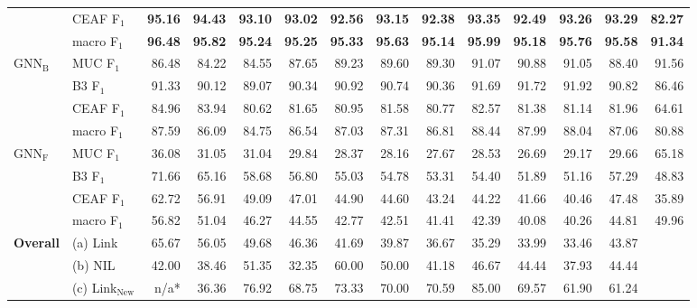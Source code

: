 \begin{landscape}
\begin{table}
\begin{tabular}{llrrrrrrrrrrrr}
& CEAF F$_1$      &  \textbf{95.16} &  \textbf{94.43} &  \textbf{93.10} &  \textbf{93.02} &  \textbf{92.56} &  \textbf{93.15} &  \textbf{92.38} &  \textbf{93.35} &  \textbf{92.49} &  \textbf{93.26} &  \textbf{93.29} & \textbf{82.27} \\
& macro F$_1$       &  \textbf{96.48} &  \textbf{95.82} &  \textbf{95.24} &  \textbf{95.25} &  \textbf{95.33} &  \textbf{95.63} &  \textbf{95.14} &  \textbf{95.99} &  \textbf{95.18} &  \textbf{95.76} &  \textbf{95.58} & \textbf{91.34} \\
\hline
$\text{GNN}_\text{B}$ & MUC F$_1$       &  86.48 &  84.22 &  84.55 &  87.65 &  89.23 &  89.60 &  89.30 &  91.07 &  90.88 &  91.05 &  88.40 & 91.56 \\
& B3 F$_1$        &  91.33 &  90.12 &  89.07 &  90.34 &  90.92 &  90.74 &  90.36 &  91.69 &  91.72 &  91.92 &  90.82 & 86.46 \\
& CEAF F$_1$      &  84.96 &  83.94 &  80.62 &  81.65 &  80.95 &  81.58 &  80.77 &  82.57 &  81.38 &  81.14 & 81.96  & 64.61  \\
& macro F$_1$ &  87.59 &  86.09 &  84.75 &  86.54 &  87.03 &  87.31 &  86.81 &  88.44 &  87.99 &  88.04 &  87.06 & 80.88 \\
\hline
$\text{GNN}_\text{F}$ & MUC F$_1$       &  36.08 &  31.05 &  31.04 &  29.84 &  28.37 &  28.16 &  27.67 &  28.53 &  26.69 &  29.17 &  29.66 &  65.18 \\
& B3 F$_1$        &  71.66 &  65.16 &  58.68 &  56.80 &  55.03 &  54.78 &  53.31 &  54.40 &  51.89 &  51.16 &  57.29 & 48.83 \\
& CEAF F$_1$      &  62.72 &  56.91 &  49.09 &  47.01 &  44.90 &  44.60 &  43.24 &  44.22 &  41.66 &  40.46 &  47.48 & 35.89 \\
& macro F$_1$ &  56.82 &  51.04 &  46.27 &  44.55 &  42.77 &  42.51 &  41.41 &  42.39 &  40.08 &  40.26 &  44.81 & 49.96 \\
\hline
\textbf{Overall} & (a) Link     &  65.67 &  56.05 &  49.68 &  46.36 &  41.69 &  39.87 &  36.67 &  35.29 &  33.99 &  33.46 &  43.87 & \\
& (b) NIL      &  42.00 &  38.46 &  51.35 &  32.35 &  60.00 &  50.00 &  41.18 &  46.67 &  44.44 &  37.93 &  44.44 & \\
& (c) Link$_{\text{New}}$ &   n/a* &  36.36 &  76.92 &  68.75 &  73.33 &  70.00 &  70.59 &  85.00 &  69.57 &  61.90 &  61.24 & \\

\end{tabular}
\end{table}
\end{landscape}
